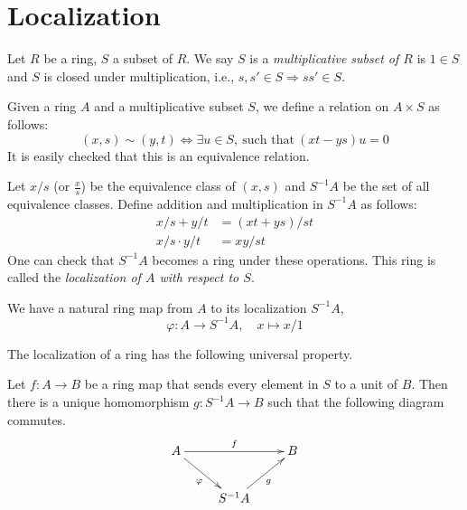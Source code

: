 




















\section{Localization}
\label{section-localization}

\begin{definition}
\label{definition-multiplicative-subset}
Let $R$ be a ring, $S$ a subset of $R$.
We say $S$ is a {\it multiplicative subset of $R$} is
$1\in S$ and $S$ is closed
under multiplication, i.e., $s, s' \in S \Rightarrow ss' \in S$.
\end{definition}

\noindent
Given a ring $A$ and a multiplicative subset $S$, we
define a relation on $A\times S$ as follows:
$$
(x, s)\sim(y, t) \iff \exists u\in S, \ \text{such that}\ (xt-ys)u = 0
$$
It is easily checked that this is an equivalence relation.

\begin{definition}
\label{definition-localization}
Let $x/s$ (or $\frac{x}{s}$) be the equivalence class of $(x, s)$ and
$S^{-1}A$ be the set of all equivalence classes. Define addition
and multiplication in $S^{-1}A$ as follows:
\begin{align}
x/s + y/t& = (xt + ys)/st\\
x/s\cdot y/t& = xy/st
\end{align}
One can check that $S^{-1}A$ becomes a ring under these operations.
This ring is called the {\it localization of $A$ with respect to $S$}.
\end{definition}

\noindent
We have a natural ring map from $A$ to its localization $S^{-1}A$,
$$
\varphi : A\rightarrow S^{-1}A, \quad x\mapsto x/1
$$

\medskip\noindent
The localization of a ring has the following universal property.

\begin{proposition}
\label{proposition-universal-property-localization}
Let $f : A\rightarrow B$ be a ring map that sends every element in $S$ to a unit
of $B$. Then there is a unique homomorphism $g : S^{-1}A\rightarrow B$ such
that the following diagram commutes.
$$
\xymatrix{
    A \ar[rr]^{f} \ar[dr]_{\varphi} & &B\\
    &S^{-1}A \ar[ur]_{g}
    }
$$
\end{proposition}

